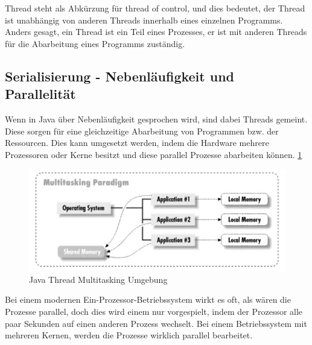  
Thread steht als Abkürzung für thread of control, und dies bedeutet, der Thread ist unabhängig von anderen Threads innerhalb eines einzelnen Programms. Anders gesagt, ein Thread ist ein Teil eines Prozesses, er ist mit anderen Threads für die Abarbeitung eines Programms zuständig.  \cite{JavaThreadsBuch}
 
 
\subsection{Serialisierung - Nebenläufigkeit und Parallelität}
Wenn in Java über Nebenläufigkeit gesprochen wird, sind dabei Threads gemeint. Diese sorgen für eine gleichzeitige Abarbeitung von Programmen bzw. der Ressourcen. Dies kann umgesetzt werden, indem die Hardware mehrere Prozessoren oder Kerne besitzt und diese parallel Prozesse abarbeiten können. \ref{fig:impl:javaThreadMultitasking}

\begin{figure}[h t]
    \centering
    \includegraphics[scale=1]{pics/javaThreadMultitasking.jpg}
    \caption{Java Thread Multitasking Umgebung \cite{JavaThreadsBuch}}
    \label{fig:impl:javaThreadMultitasking}
\end{figure}

Bei einem modernen Ein-Prozessor-Betriebssystem wirkt es oft, als wären die Prozesse parallel, doch dies wird einem nur vorgespielt, indem der Prozessor alle paar Sekunden auf einen anderen Prozess wechselt. Bei einem Betriebssystem mit mehreren Kernen, werden die Prozesse wirklich parallel bearbeitet. \cite{javaInselBuch}

